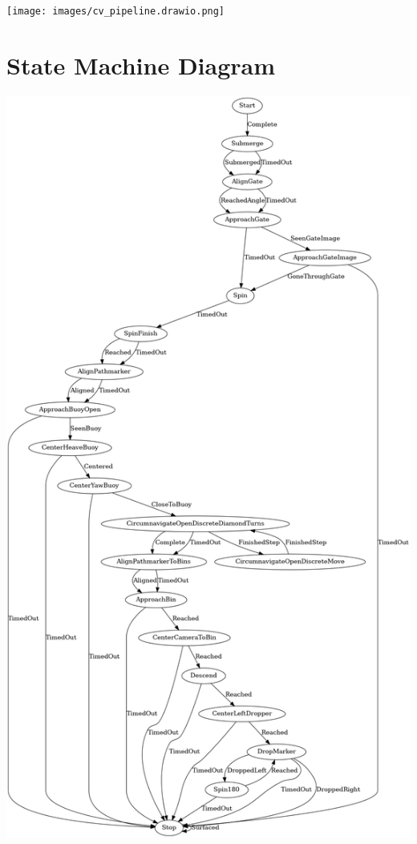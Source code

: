 \documentclass[conference]{IEEEtran}
\begin{document}
\vspace{0.5cm}
\texttt{[image: images/cv\_pipeline.drawio.png]}
\newpage
\clearpage


\section{State Machine Diagram}
\includegraphics[scale=0.27]{images/machine2.png}
\newpage
\end{document}
